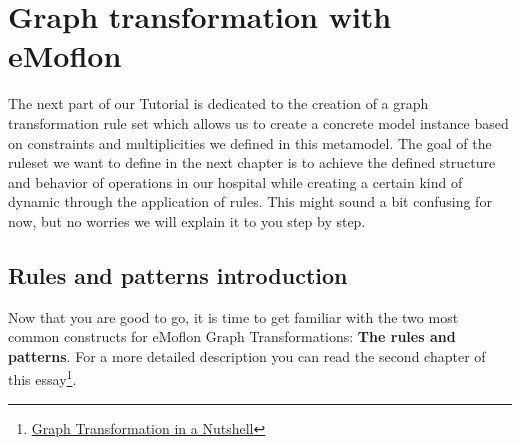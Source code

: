 \section{Graph transformation with eMoflon}

The next part of our Tutorial is dedicated to the creation of a graph transformation rule set which allows us to create a concrete model instance based on constraints and multiplicities we defined in this metamodel. The goal of the ruleset we want to define in the next chapter is to achieve the defined structure and behavior of operations in our hospital while creating a certain kind of dynamic through the application of rules. This might sound a bit confusing for now, but no worries we will explain it to you step by step.

\subsection{Rules and patterns introduction}



Now that you are good to go, it is time to get familiar with the two most common constructs for eMoflon Graph Transformations: \textbf{The rules and patterns}. For a more detailed description you can read the second chapter of this essay\footnote{\href{https://www.cs.le.ac.uk/people/rh122/papers/2006/Hec06Nutshell.pdf}{Graph Transformation in a Nutshell}}.\newline

